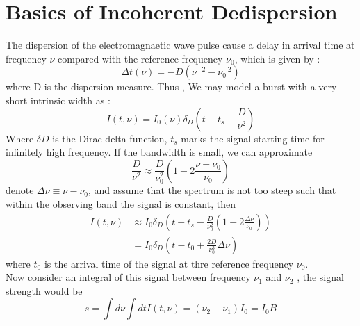\documentclass[twocolumn]{aastex61}
\begin{document}



\section{Basics of Incoherent Dedispersion}
\label{sec:obs}

The dispersion of the electromagnaetic wave pulse cause a delay in arrival time at frequency $\nu$ compared with the reference frequency $\nu_0$, which is given by :
\begin{equation}
\Delta t (\nu) = -D(\nu^{-2} -\nu^{-2}_{0})
\end{equation}
where D is the dispersion measure. Thus , We may model a burst with a very short intrinsic width as :
\begin{equation}
I(t,\nu)=I_0(\nu)\delta_D(t-t_s -\frac{D}{\nu^2})
\end{equation}
Where $\delta D$ is the Dirac delta function, $t_s$ marks the signal starting time for infinitely high frequency. If the bandwidth is small, we can approximate
\begin{equation*}
\frac{D}{\nu^{2}}\approx\frac{D}{\nu_0^2}(1-2\frac{\nu-\nu_0}{\nu_0})
\end{equation*}
denote $\Delta　\nu \equiv \nu - \nu_0$, and assume that the spectrum is not too steep such that within the observing band the signal is constant, then
\begin{equation}
\begin{aligned}
I(t,\nu) & \approx I_0\delta_D(t-t_s-\frac{D}{\nu_0^2}(1-2\frac{\Delta\nu}{\nu_0}) ) \\
		 & = I_0\delta_D(t -t_0 +\frac{2D}{\nu_0^3}\Delta\nu)
\end{aligned} 
\end{equation}
where $t_0$ is the arrival time of the signal at thre reference frequency $\nu_0$. \\
	Now consider an integral of this signal between frequency $\nu_1 $ and $\nu_2$ , the signal strength would be
\begin{equation}
s = \int d \nu \int dtI(t,\nu)=(\nu_2 -\nu_1)I_0 = I_0B
\end{equation}
\end{document}
